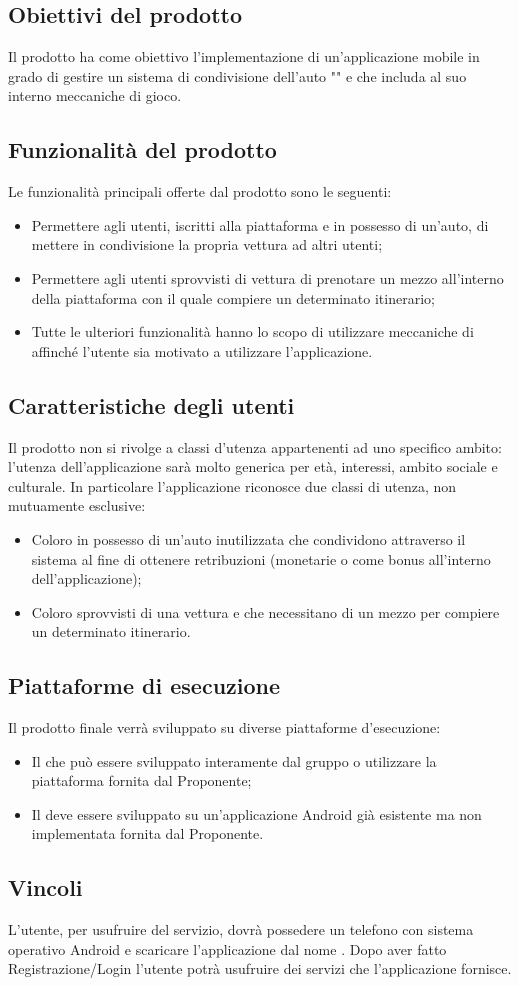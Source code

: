 \subsection{Obiettivi del prodotto}
Il prodotto ha come obiettivo l'implementazione di un'applicazione mobile  in grado di gestire un sistema di condivisione dell'auto "" e che includa al suo interno meccaniche di gioco. 


\subsection{Funzionalità del prodotto}
Le funzionalità principali offerte dal prodotto sono le seguenti:
\begin{itemize}
    \item Permettere agli utenti, iscritti alla piattaforma e in possesso di un'auto, di mettere in condivisione la propria vettura ad altri utenti;
    \item Permettere agli utenti sprovvisti di vettura di prenotare un mezzo all'interno della piattaforma con il quale compiere un determinato itinerario;
    \item Tutte le ulteriori funzionalità hanno lo scopo di utilizzare meccaniche di  affinché l'utente sia motivato a utilizzare l'applicazione.
    
\end{itemize}
\subsection{Caratteristiche degli utenti}
Il prodotto non si rivolge a classi d'utenza appartenenti ad uno specifico ambito: l'utenza dell'applicazione sarà molto generica per età, interessi, ambito sociale e culturale. In particolare l'applicazione riconosce due classi di utenza, non mutuamente esclusive:
\begin{itemize}
    \item Coloro in possesso di un'auto inutilizzata  che condividono attraverso il sistema al fine di ottenere retribuzioni (monetarie o come bonus all'interno dell'applicazione);
    \item Coloro sprovvisti di una vettura e che necessitano di un mezzo per compiere un determinato itinerario.
\end{itemize}

\subsection{Piattaforme di esecuzione}
Il prodotto finale verrà sviluppato su diverse piattaforme d’esecuzione:
\begin{itemize}
    \item  Il  che può essere sviluppato interamente dal gruppo o utilizzare la piattaforma  fornita dal Proponente;
    \item Il  deve essere sviluppato su un'applicazione Android già esistente ma non implementata fornita dal Proponente.
\end{itemize}

\subsection{Vincoli}
L'utente, per usufruire del servizio, dovrà possedere un telefono con sistema operativo Android e scaricare l'applicazione dal nome . Dopo aver fatto Registrazione/Login l'utente potrà usufruire dei servizi che l'applicazione fornisce. 

